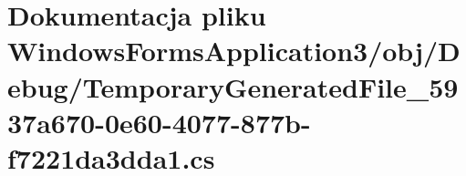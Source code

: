 \hypertarget{_temporary_generated_file__5937a670-0e60-4077-877b-f7221da3dda1_8cs}{}\section{Dokumentacja pliku Windows\+Forms\+Application3/obj/\+Debug/\+Temporary\+Generated\+File\+\_\+5937a670-\/0e60-\/4077-\/877b-\/f7221da3dda1.cs}
\label{_temporary_generated_file__5937a670-0e60-4077-877b-f7221da3dda1_8cs}
